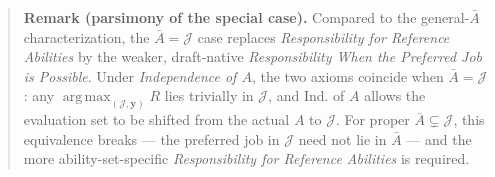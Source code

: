 \documentclass[12pt,thmsb]{article}
\DeclareMathOperator*{\argmax}{arg\,max}
\begin{document}
\begin{quote}
\textbf{Remark (parsimony of the special case).} Compared to the general-$\bar A$ characterization, the $\bar A=\mathcal J$ case replaces \emph{Responsibility for Reference Abilities} by the weaker, draft-native \emph{Responsibility When the Preferred Job is Possible}. Under \emph{Independence of $A$}, the two axioms coincide when $\bar A=\mathcal J$: any $\argmax_{(\mathcal J,\mathbf y)}R$ lies trivially in $\mathcal J$, and Ind. of $A$ allows the evaluation set to be shifted from the actual $A$ to $\mathcal J$. For proper $\bar A\subsetneq\mathcal J$, this equivalence breaks --- the preferred job in $\mathcal J$ need not lie in $\bar A$ --- and the more ability-set-specific \emph{Responsibility for Reference Abilities} is required.
\end{quote}
\end{document}
